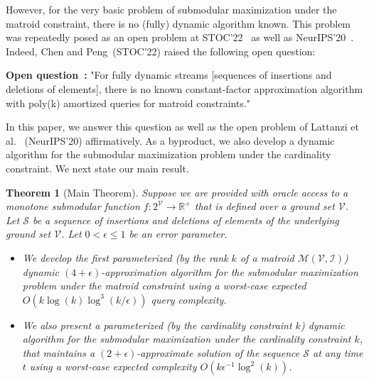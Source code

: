 \documentclass[11pt]{article}
\newtheorem{theorem}{Theorem}
\newcommand{\mO}{O}
\newcommand{\matroid}{\mathcal{M}(\ground,\mathcal{I})}
\newcommand{\ground}{\ensuremath{\mathcal{V}}}
\begin{document}
However, for the very basic problem of submodular maximization under the matroid constraint, there is no (fully) dynamic algorithm known. This problem was repeatedly  posed as an open problem at 
STOC'22~\cite{DBLP:journals/corr/abs-2111-03198} as well as NeurIPS'20~\cite{DBLP:conf/nips/LattanziMNTZ20}. 
Indeed, Chen and Peng~\cite{DBLP:journals/corr/abs-2111-03198}(STOC'22) raised the following open question: 



\begin{tcolorbox}[width=\linewidth, colback=white!80!gray,boxrule=0pt,frame hidden, sharp corners]
\textbf{Open question~\cite{DBLP:journals/corr/abs-2111-03198,DBLP:conf/nips/LattanziMNTZ20}:} 
"For fully dynamic streams [sequences of 
insertions and deletions of elements], there is no known constant-factor approximation 
algorithm with poly(k) amortized queries for matroid constraints." 
\end{tcolorbox}


In this paper, we answer this question as well as the open problem of Lattanzi et al.~\cite{DBLP:conf/nips/LattanziMNTZ20} (NeurIPS'20) affirmatively. 
As a byproduct, we also develop a dynamic algorithm for the 
submodular maximization problem under the cardinality constraint. 
We next state our main result. 


\begin{tcolorbox}[width=\linewidth, colback=white!80!gray,boxrule=0pt,frame hidden, sharp corners]
\begin{theorem} 
[Main Theorem]
\label{thm:main}
Suppose we are provided with oracle access to a monotone submodular function $f: 2^{\ground} \rightarrow \mathbb{R}^+$ 
that is defined over a ground set $\ground$. 
Let $\mathcal{S}$ be a  sequence of insertions and deletions of elements of the underlying ground set $\ground$. 
Let $0 < \epsilon \le 1$ be an error parameter. 
\begin{itemize}
\item We develop the first parameterized (by the rank $k$ of a matroid $\matroid$) 
dynamic $(4+\epsilon)$-approximation algorithm for the submodular maximization problem under the matroid constraint using a worst-case expected $O(k\log(k)\log^3{(k/\epsilon)})$ query complexity. 
\item  We also  present a parameterized (by the cardinality constraint $k$) dynamic algorithm for the submodular maximization under the cardinality  constraint $k$, that maintains a $(2+\epsilon)$-approximate solution of the sequence $\mathcal{S}$ 
at any time $t$ using a worst-case expected complexity $\mO(k\epsilon^{-1}\log^2(k))$. 
\end{itemize}                
\end{theorem}

\end{tcolorbox}
\end{document}
